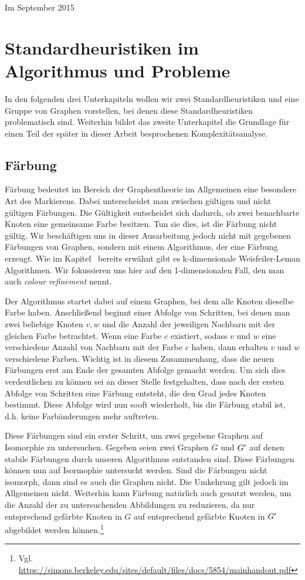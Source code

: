 \documentclass[a4paper]{article}
\newcommand{\wlcoloring}{\url{https://simons.berkeley.edu/sites/default/files/docs/5854/mainhandout.pdf}}
\begin{document}
Im September 2015
\section{Standardheuristiken im Algorithmus und Probleme}
In den folgenden drei Unterkapiteln wollen wir zwei Standardheuristiken und eine Gruppe von Graphen vorstellen, bei denen diese Standardheuristiken problematisch sind. Weiterhin bildet das zweite Unterkapitel die Grundlage für einen Teil der später in dieser Arbeit besprochenen Komplexitätsanalyse.

\subsection{Färbung}
Färbung bedeutet im Bereich der Graphentheorie im Allgemeinen eine besondere Art des Markierens. Dabei unterscheidet man zwischen gültigen und nicht gültigen Färbungen. Die Gültigkeit entscheidet sich dadurch, ob zwei benachbarte Knoten eine gemeinsame Farbe besitzen. Tun sie dies, ist die Färbung nicht gültig. Wir beschäftigen uns in dieser Ausarbeitung jedoch nicht mit gegebenen Färbungen von Graphen, sondern mit einem Algorithmus, der eine Färbung erzeugt. Wie im Kapitel \glqq{}\grqq\ bereits erwähnt gibt es k-dimensionale Weisfeiler-Leman Algorithmen. Wir fokussieren uns hier auf den 1-dimensionalen Fall, den man auch \emph{colour refinement} nennt.

Der Algorithmus startet dabei auf einem Graphen, bei dem alle Knoten dieselbe Farbe haben. Anschließend beginnt einer Abfolge von Schritten, bei denen man zwei beliebige Knoten $v, w$ und die Anzahl der jeweiligen Nachbarn mit der gleichen Farbe betrachtet. Wenn eine Farbe $c$ existiert, sodass $v$ und $w$ eine verschiedene Anzahl von Nachbarn mit der Farbe $c$ haben, dann erhalten $v$ und $w$ verschiedene Farben. Wichtig ist in diesem Zusammenhang, dass die neuen Färbungen erst am Ende der gesamten Abfolge gemacht werden. Um sich dies verdeutlichen zu können sei an dieser Stelle festgehalten, dass nach der ersten Abfolge von Schritten eine Färbung entsteht, die den Grad jedes Knoten bestimmt. Diese Abfolge wird nun sooft wiederholt, bis die Färbung stabil ist, d.h. keine Farbänderungen mehr auftreten. 

Diese Färbungen sind ein erster Schritt, um zwei gegebene Graphen auf Isomorphie zu untersuchen. Gegeben seien zwei Graphen $G$ und $G\rq{}$ auf denen stabile Färbungen durch unseren Algorithmus entstanden sind. Diese Färbungen können nun auf Isormophie untersucht werden. Sind die Färbungen nicht isomorph, dann sind es auch die Graphen nicht. Die Umkehrung gilt jedoch im Allgemeinen nicht. Weiterhin kann Färbung natürlich auch genutzt werden, um die Anzahl der zu untersuchenden Abbildungen zu reduzieren, da nur entsprechend gefärbte Knoten in $G$ auf entsprechend gefärbte Knoten in $G\rq{}$ abgebildet werden können.\footnote{Vgl. \wlcoloring} 
\end{document}
